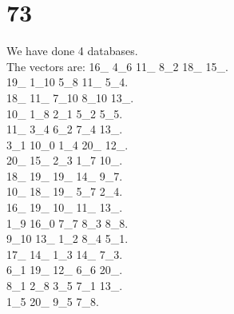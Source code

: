 \chapter{73}
\indent We have done 4 databases.\\
The vectors are:
16\_ 4\_6 11\_ 8\_2 18\_ 15\_.\\19\_ 1\_10 5\_8 11\_ 5\_4.\\18\_ 11\_ 7\_10 8\_10 13\_.\\10\_ 1\_8 2\_1 5\_2 5\_5.\\11\_ 3\_4 6\_2 7\_4 13\_.\\3\_1 10\_0 1\_4 20\_ 12\_.\\20\_ 15\_ 2\_3 1\_7 10\_.\\18\_ 19\_ 19\_ 14\_ 9\_7.\\10\_ 18\_ 19\_ 5\_7 2\_4.\\16\_ 19\_ 10\_ 11\_ 13\_.\\1\_9 16\_0 7\_7 8\_3 8\_8.\\9\_10 13\_ 1\_2 8\_4 5\_1.\\17\_ 14\_ 1\_3 14\_ 7\_3.\\6\_1 19\_ 12\_ 6\_6 20\_.\\8\_1 2\_8 3\_5 7\_1 13\_.\\1\_5 20\_ 9\_5 7\_8.\\